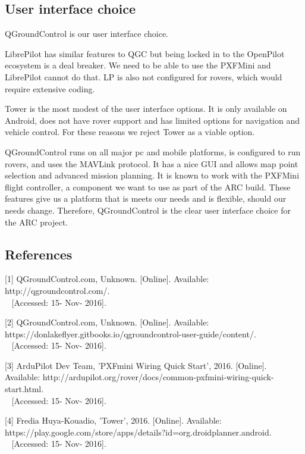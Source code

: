\documentclass[compsoc,draftclsnofoot,onecolumn,10pt]{IEEEtran}
\begin{document}
\subsection{User interface choice}
QGroundControl is our user interface choice.\par
LibrePilot has similar features to QGC but being locked in to the OpenPilot
ecosystem is a deal breaker. We need to be able to use the PXFMini and
LibrePilot cannot do that. LP is also not configured for rovers, which would
require extensive coding.\par
Tower is the most modest of the user interface options. It is only available on
Android, does not have rover support and has limited options for navigation and
vehicle control. For these reasons we reject Tower as a viable option.\par
QGroundControl runs on all major pc and mobile platforms, is configured to run
rovers, and uses the MAVLink protocol. It has a nice GUI and allows map point
selection and advanced mission planning. It is known to work with the PXFMini
flight controller, a component we want to use as part of the ARC build. These
features give us a platform that is meets our needs and is flexible, should our
needs change. Therefore, QGroundControl is the clear user interface choice for
the ARC project.

\subsection{References}

[1] QGroundControl.com, Unknown. [Online]. Available: http://qgroundcontrol.com/.\\~
[Accessed: 15- Nov- 2016].\par

[2] QGroundControl.com, Unknown. [Online]. 
Available: https://donlakeflyer.gitbooks.io/qgroundcontrol-user-guide/content/.\\~
[Accessed: 15- Nov- 2016].\par

[3] ArduPilot Dev Team, 'PXFmini Wiring Quick Start', 2016. [Online]. 
Available: http://ardupilot.org/rover/docs/common-pxfmini-wiring-quick-start.html.\\~
[Accessed: 15- Nov- 2016].\par

[4] Fredia Huya-Kouadio, 'Tower', 2016. [Online]. 
Available: https://play.google.com/store/apps/details?id=org.droidplanner.android.\\~
[Accessed: 15- Nov- 2016].\par
\end{document}
